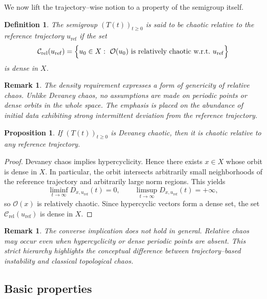 \documentclass[12pt]{article}
\newtheorem{proposition}[theorem]{Proposition}
\newtheorem{definition}[theorem]{Definition}
\newtheorem{remark}[theorem]{Remark}
\begin{document}
We now lift the trajectory--wise notion to a property of the semigroup itself.

\begin{definition}\label{def:relchaos_semigroup}
The semigroup $(T(t))_{t\ge 0}$ is said to be \emph{chaotic relative to the reference trajectory $u_{\mathrm{ref}}$} if the set
\[
\mathcal{C}_{\mathrm{rel}}(u_{\mathrm{ref}})
=
\Bigl\{
u_0\in X:\ \mathcal{O}(u_0)\ \text{is relatively chaotic w.r.t.}\ u_{\mathrm{ref}}
\Bigr\}
\]
is dense in $X$.
\end{definition}

\begin{remark}\label{rem:density_choice}
The density requirement expresses a form of \emph{genericity} of relative chaos. Unlike Devaney chaos, no assumptions are made on periodic points or dense orbits in the whole space. The emphasis is placed on the abundance of initial data exhibiting strong intermittent deviation from the reference trajectory.
\end{remark}

\begin{proposition}\label{prop:devaney_vs_relative}
If $(T(t))_{t\ge 0}$ is Devaney chaotic, then it is chaotic relative to any reference trajectory.
\end{proposition}

\begin{proof}
Devaney chaos implies hypercyclicity. Hence there exists $x\in X$ whose orbit is dense in $X$. In particular, the orbit intersects arbitrarily small neighborhoods of the reference trajectory and arbitrarily large norm regions. This yields
\[
\liminf_{t\to\infty}D_{x,u_{\mathrm{ref}}}(t)=0,
\qquad
\limsup_{t\to\infty}D_{x,u_{\mathrm{ref}}}(t)=+\infty,
\]
so $\mathcal{O}(x)$ is relatively chaotic. Since hypercyclic vectors form a dense set, the set $\mathcal{C}_{\mathrm{rel}}(u_{\mathrm{ref}})$ is dense in $X$.
\end{proof}

\begin{remark}\label{rem:strictness}
The converse implication does not hold in general. Relative chaos may occur even when hypercyclicity or dense periodic points are absent. This strict hierarchy highlights the conceptual difference between trajectory--based instability and classical topological chaos.
\end{remark}


\subsection{Basic properties}
\end{document}
